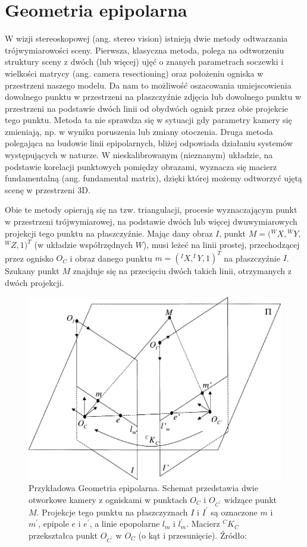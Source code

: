 \chapter{Geometria epipolarna}

W wizji stereoskopowej (ang. stereo vision) istnieją dwie metody odtwarzania
trójwymiarowości sceny. Pierwsza, klasyczna metoda, polega na odtworzeniu
struktury sceny z dwóch (lub więcej) ujęć o znanych parametrach soczewki i
wielkości matrycy (ang. camera resectioning) oraz położeniu ogniska w
przestrzeni naszego modelu. Da nam to możliwość oszacowania umiejscowienia
dowolnego punktu w przestrzeni na płaszczyźnie zdjęcia lub dowolnego punktu w
przestrzeni na podstawie dwóch linii od obydwóch ognisk przez obie projekcie
tego punktu. Metoda ta nie sprawdza się w sytuacji gdy parametry kamery się
zmieniają, np. w wyniku poruszenia lub zmiany otoczenia.  Druga metoda
polegająca na budowie linii epipolarnych, bliżej odpowiada działaniu systemów
występujących w naturze. W nieskalibrowanym (nieznanym) układzie, na podstawie
korelacji punktowych pomiędzy obrazami, wyznacza się macierz fundamentalną
(ang. fundamental matrix), dzięki której możemy odtworzyć ujętą scenę w
przestrzeni 3D. 

Obie te metody opierają się na tzw. triangulacji, procesie wyznaczającym punkt
w przestrzeni trójwymiarowej, na podstawie dwóch lub więcej dwuwymiarowych
projekcji tego punktu na płaszczyźnie. Mając dany obraz $I$, punkt
$M=($$^{W}X,$$^{W}Y,$$^{W}Z,$$1)^T$ (w układzie współrzędnych
$W$), musi leżeć na linii prostej, przechodzącej przez ognisko $O_C$ i obraz
danego punktu $m=(^{I}X,^{I}Y,1)^T$ na płaszczyźnie $I$. Szukany punkt $M$
znajduje się na przecięciu dwóch takich linii, otrzymanych z dwóch projekcji. 

\begin{figure}[h!] \centering
  \includegraphics[width=1\textwidth]{images/epipolar_geometry.png}
  \caption{Przykładowa Geometria epipolarna. Schemat przedstawia dwie otworkowe
  kamery z ogniskami w punktach $O_C$ i $O_{C^\prime}$ widzące punkt $M$.
  Projekcje tego punktu na płaszczyznach $I$ i $I^\prime$ są oznaczone $m$ i
  $m^\prime$, epipole $e$ i $e^\prime$, a linie epopolarne $l_{m}$ i
  $l_m^\prime$. Macierz $^C K_C$ przekształca punkt $O_{C^\prime}$ w $O_C$ (o kąt i przesunięcie). Źródło: \cite{fm_overview} } \end{figure}

